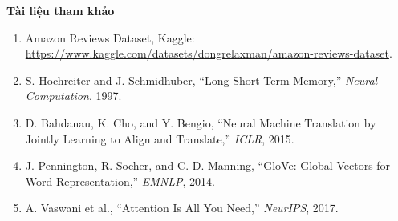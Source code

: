 \documentclass[aspectratio=169]{beamer}
\begin{document}
\begin{frame}[allowframebreaks]{\textbf{\large Tài liệu tham khảo}}
    \scriptsize
    \begin{enumerate}
        \item Amazon Reviews Dataset, Kaggle:
        \url{https://www.kaggle.com/datasets/dongrelaxman/amazon-reviews-dataset}.

        \item S. Hochreiter and J. Schmidhuber,
        ``Long Short-Term Memory,'' \textit{Neural Computation}, 1997.

        \item D. Bahdanau, K. Cho, and Y. Bengio,
        ``Neural Machine Translation by Jointly Learning to Align and
        Translate,'' \textit{ICLR}, 2015.

        \item J. Pennington, R. Socher, and C. D. Manning,
        ``GloVe: Global Vectors for Word Representation,''
        \textit{EMNLP}, 2014.

        \item A. Vaswani et al.,
        ``Attention Is All You Need,'' \textit{NeurIPS}, 2017.
    \end{enumerate}
\end{frame}

\begin{frame}
    \centering
    \Huge{}
\end{frame}
\end{document}
